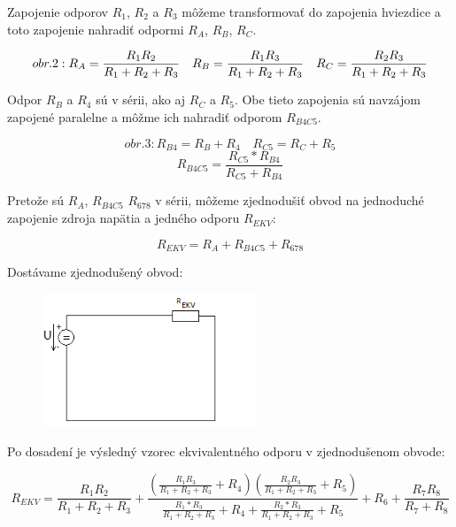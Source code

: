 \documentclass[a4paper,12pt]{article}
\begin{document}
\begin{flushleft}
Zapojenie odporov $R_1$, $R_2$ a $R_3$ môžeme transformovať do zapojenia hviezdice a toto zapojenie nahradiť odpormi $R_A$, $R_B$, $R_C$. 
\end{flushleft}
\begin{equation*}
obr.2 : R_A = \frac{R_{1}R_{2}}{R_1+R_2+R_3} \quad R_B = \frac{R_{1}R_{3}}{R_1+R_2+R_3} 
\quad R_C = \frac{R_{2}R_{3}}{R_1+R_2+R_3} \\
\end{equation*}
\bigskip
\begin{flushleft}
Odpor $R_B$ a $R_4$ sú v sérii, ako aj $R_C$ a $R_5$. Obe tieto zapojenia sú navzájom zapojené paralelne a môžme ich nahradiť odporom $R_{B4C5}$.
\end{flushleft}
\begin{equation*}
obr.3 : R_{B4} = R_B + R_4 \quad R_{C5} = R_C + R_5 
\end{equation*}
\begin{equation*}
R_{B4C5} = \frac{R_{C5} * R_{B4}}{R_{C5} + R_{B4}}
\end{equation*}

\begin{flushleft}
Pretože sú $R_A$, $R_{B4C5}$ $R_{678}$ v sérii, môžeme zjednodušiť obvod na jednoduché zapojenie zdroja napätia a jedného odporu $R_{EKV}$:
\end{flushleft}
\begin{equation*}
R_{EKV} = R_A + R_{B4C5} + R_{678}
\end{equation*}

\begin{flushleft}
Dostávame zjednodušený obvod:
\end{flushleft}
\begin{figure}[!h]
  \centering
  \includegraphics[height=4cm]{obrazky/pr1d}
\end{figure}

\begin{flushleft}
Po dosadení je výsledný vzorec ekvivalentného odporu v zjednodušenom obvode:
\end{flushleft}
\begin{equation*}
R_{EKV} = \frac{R_{1}R_{2}}{R_1+R_2+R_3}
+ \frac{(\frac{R_{1}R_{3}}{R_1+R_2+R_3}+R_4)(\frac{R_{2}R_{3}}{R_1+R_2+R_3}+R_5)}
       {\frac{R_{1} * R_{3}}{R_{1}+R_{2}+R_3} + R_4 + \frac{R_{2} * R_{3}}{R_{1}+R_{2}+R_3} + R_5  } 
+ R_6 + \frac{R_{7}R_{8}}{R_7+R_8} 
\end{equation*}
\end{document}
